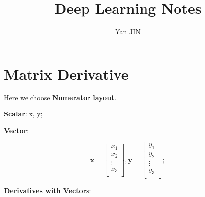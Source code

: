 \documentclass[12pt]{article}
\numberwithin{equation}{section}
\begin{document}
\small
\title{Deep Learning\citep{Goodfellow-et-al-2016-Book} Notes}
\author{Yan JIN}
\pagestyle{fancy}\fancyhf{}
\lhead{}
\lfoot{\textit{}}\cfoot{}\rfoot{\thepage}
\renewcommand{\headrulewidth}{1.pt}
\renewcommand{\footrulewidth}{1.pt}
\maketitle
\tableofcontents
\section{Matrix Derivative} \par
Here we choose \textbf{Numerator layout}. \par
\textbf{Scalar}: x, y; \par
\textbf{Vector}:\par
\begin{equation}
	\mathbf{x} = 
	\begin{bmatrix}
		x_1\\ x_2\\ \vdots\\ x_3\\
	\end{bmatrix}, 
	\mathbf{y} = 
	\begin{bmatrix}
		y_1\\ y_2\\ \vdots\\ y_3\\
	\end{bmatrix};	
\end{equation}\par
\textbf{Derivatives with Vectors}:
\end{document}
